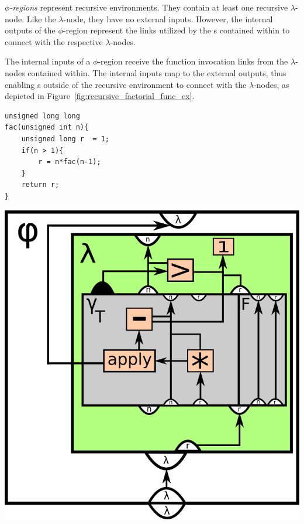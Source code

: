 \begin{itemize}
\textit{$\phi$-regions} represent recursive environments. They contain at least
one recursive $\lambda$-node. Like the $\lambda$-node, they have no external
inputs. However, the internal outputs of the $\phi$-region represent the links
utilized by the \applyNode s contained within to connect with the respective
$\lambda$-nodes.

The internal inputs of a $\phi$-region receive the function invocation links
from the $\lambda$-nodes contained within. The internal inputs map to the
external outputs, thus enabling \applyNode s outside of the recursive
environment to connect with the $\lambda$-nodes, as depicted in
Figure~\ref{fig:recursive_factorial_func_ex}.

\begin{centering}
	\noindent\begin{minipage}{0.37\textwidth}
		\begin{CenteredBox}
		\begin{lstlisting}[label={lst:recursive_factorial_func_ex},
style=minipage_customcpp, basicstyle=\fontsize{10}{1}]
unsigned long long
fac(unsigned int n){
	unsigned long r  = 1;
	if(n > 1){
		r = n*fac(n-1);
	}
	return r;
}
		\end{lstlisting}
		\end{CenteredBox}
	\end{minipage}
	\noindent\begin{minipage}{0.55\textwidth}
		\captionsetup{type=figure}
		\includegraphics[width=\textwidth]{figures/recursive_factorial_func_ex}
	\end{minipage}
	\label{fig:recursive_factorial_func_ex}
\end{centering}

\end{itemize}
